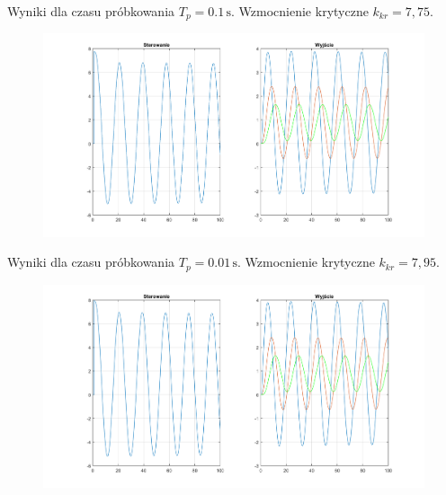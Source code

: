 \documentclass[a4paper, 12pt]{article}
\begin{document}
			\newpage
			\noindent Wyniki dla czasu próbkowania $T_p = 0.1 \, \mathrm{s}$. Wzmocnienie krytyczne $k_{kr} = 7,75$.
			\begin{figure}[H]
				\centering
				\includegraphics[width = \textwidth]{./img/trzy_k_7_75.png}
			\end{figure}
			\noindent Wyniki dla czasu próbkowania $T_p = 0.01 \, \mathrm{s}$. Wzmocnienie krytyczne $k_{kr} = 7,95$.
			\begin{figure}[H]
				\centering
				\includegraphics[width = \textwidth]{./img/trzy_k_7_95.png}
			\end{figure}
			\newpage
\end{document}
